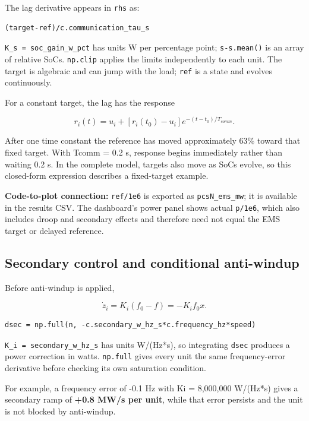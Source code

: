 \documentclass[11pt,a4paper]{article}
\begin{document}
The lag derivative appears in \texttt{rhs} as:

\begin{lstlisting}
(target-ref)/c.communication_tau_s
\end{lstlisting}

\texttt{K\_s = soc\_gain\_w\_pct} has units W per percentage point; \texttt{s-s.mean()} is an array of relative SoCs. \texttt{np.clip} applies the limits independently to each unit. The target is algebraic and can jump with the load; \texttt{ref} is a state and evolves continuously.

For a constant target, the lag has the response

\[
r_i(t)=u_i+[r_i(t_0)-u_i]e^{-(t-t_0)/T_{comm}}.
\]

After one time constant the reference has moved approximately 63\% toward that fixed target. With Tcomm = 0.2 s, response begins immediately rather than waiting 0.2 s. In the complete model, targets also move as SoCs evolve, so this closed-form expression describes a fixed-target example.

\textbf{Code-to-plot connection:} \texttt{ref/1e6} is exported as \texttt{pcsN\_ems\_mw}; it is available in the results CSV. The dashboard's power panel shows actual \texttt{p/1e6}, which also includes droop and secondary effects and therefore need not equal the EMS target or delayed reference.

\subsection{Secondary control and conditional anti-windup}

Before anti-windup is applied,

\[
\dot z_i=K_i(f_0-f)=-K_if_0x.
\]

\begin{lstlisting}
dsec = np.full(n, -c.secondary_w_hz_s*c.frequency_hz*speed)
\end{lstlisting}

\texttt{K\_i = secondary\_w\_hz\_s} has units W/(Hz*s), so integrating \texttt{dsec} produces a power correction in watts. \texttt{np.full} gives every unit the same frequency-error derivative before checking its own saturation condition.

For example, a frequency error of -0.1 Hz with Ki = 8,000,000 W/(Hz*s) gives a secondary ramp of \textbf{+0.8 MW/s per unit}, while that error persists and the unit is not blocked by anti-windup.
\end{document}
